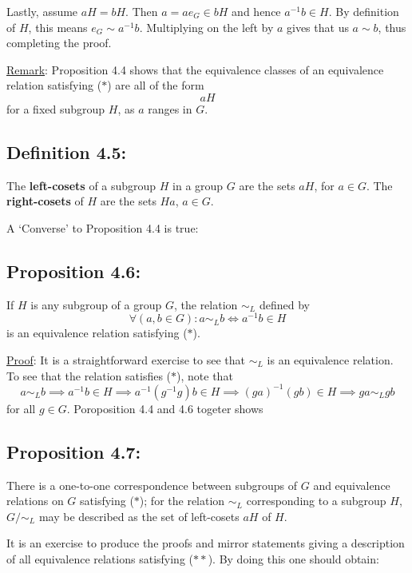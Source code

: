\vspace{1em}

Lastly, assume $aH = bH$. Then $a = ae_G \in bH$ and hence $a^{-1}b \in H$. By definition of $H$, this means $e_G \sim a^{-1}b$. Multiplying on the left by $a$ gives that us $a \sim b$, thus completing the proof.

\noindent\underline{Remark}: Proposition 4.4 shows that the equivalence classes of an equivalence relation satisfying ($*$) are all of the form
$$aH$$
for a fixed subgroup $H$, as $a$ ranges in $G$.

\subsection*{Definition 4.5:}
The \textbf{left-cosets} of a subgroup $H$ in a group $G$ are the sets $aH$, for $a \in G$. The \textbf{right-cosets} of $H$ are the sets $Ha$, $a \in G$.

\vspace{1em}
\noindent A `Converse' to Proposition 4.4 is true:

\subsection*{Proposition 4.6:}
If $H$ is any subgroup of a group $G$, the relation $\sim_L$ defined by
$$\forall(a, b \in G) : a \sim_L b \iff a^{-1}b \in H$$
is an equivalence relation satisfying ($*$).

\noindent\underline{Proof}: It is a straightforward exercise to see that $\sim_L$ is an equivalence relation. To see that the relation satisfies ($*$), note that
$$a \sim_L b \implies a^{-1}b \in H \implies a^{-1}(g^{-1}g)b \in H \implies (ga)^{-1}(gb) \in H \implies ga \sim_L gb$$
for all $g \in G$.  Poroposition 4.4 and 4.6 togeter shows

\subsection*{Proposition 4.7:}
There is a one-to-one correspondence between subgroups of $G$ and equivalence relations on $G$ satisfying ($*$); for the relation $\sim_L$ corresponding to a subgroup $H$, $G/{\sim_L}$ may be described as the set of left-cosets $aH$ of $H$.

\vspace{1em}

\noindent It is an exercise to produce the proofs and mirror statements giving a description of all equivalence relations satisfying ($**$). By doing this one should obtain:

